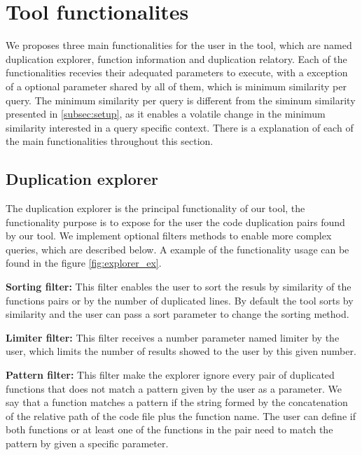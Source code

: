 \en

\section{Tool functionalites}
\label{subsec:func}

We proposes three main functionalities for the user in the tool, which are named duplication explorer, function information
and duplication relatory. Each of the functionalities recevies their adequated parameters to execute, with a exception
of a optional parameter shared by all of them, which is minimum similarity per query. The minimum similarity per query is different
from the siminum similarity presented in \ref{subsec:setup}, as it enables a volatile change in the minimum similarity
interested in a query specific context. There is a explanation of each of the main functionalities throughout this section.

\subsection{Duplication explorer}

The duplication explorer is the principal functionality of our tool, the functionality purpose is to expose for the user the code duplication
pairs found by our tool. We implement optional filters methods to enable more complex queries, which are described below. A example
of the functionality usage can be found in the figure \ref{fig:explorer_ex}.


\begin{itemize}
	\begin{item}
		\textbf{Sorting filter:} This filter enables the user to sort the resuls by similarity of the functions pairs or 
		by the number of duplicated lines. By default the tool sorts by similarity and the user can pass a sort parameter to change
		the sorting method.
	\end{item}

	\begin{item}
		\textbf{Limiter filter:} This filter receives a number parameter named limiter by the user, which limits the number of results
		showed to the user by this given number.
	\end{item}

	\begin{item}
		\textbf{Pattern filter:} This filter make the explorer ignore every pair of duplicated functions that does not match a pattern
		given by the user as a parameter. We say that a function matches a pattern if the string formed by the concatenation of
		the relative path of the code file plus the function name. The user can define if both functions or at least one of the 
		functions in the pair need to match the pattern by given a specific parameter.
	\end{item}
\end{itemize}

